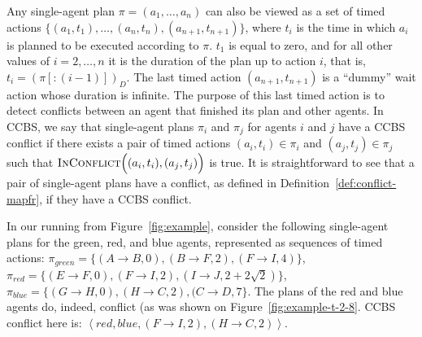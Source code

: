 \documentclass[review]{elsarticle}
\newtheorem{lemma}{Lemma}
\newcommand{\tuple}[1]{\ensuremath{\left \langle #1 \right \rangle }}
\newcommand\roni[1]{\nb{\textbf{Roni:}}{green}{#1}}
\newcommand{\ccbs}{\ac{CCBS}\xspace}
\newcommand{\inconflict}{\textsc{InConflict}\xspace}
\begin{document}
Any single-agent plan $\pi = (a_1,\ldots, a_n)$ can also be viewed as a set of timed actions $\big\{ (a_1,t_1),\ldots,(a_n,t_n) ,(a_{n+1},t_{n+1}) \big\}$, where $t_i$ is the time in which $a_i$ is planned to be executed according to $\pi$. 
$t_1$ is equal to zero, and for all other values of $i=2,\ldots, n$ it is the duration of the plan up to action $i$, that is, $t_i=(\pi[:(i-1)])_D$. 
The last timed action $(a_{n+1}, t_{n+1})$ is a ``dummy'' wait action whose duration is infinite. The purpose of this last timed action is to detect conflicts between an agent that finished its plan and other agents. 
In \ccbs, we say that single-agent plans $\pi_i$ and $\pi_j$ for agents $i$ and $j$ have a \ccbs  conflict if there exists a pair of timed actions $(a_i,t_i)\in \pi_i$ and $(a_j,t_j)\in \pi_j$ such that $\inconflict \Big((a_i,t_i), (a_j,t_j)\Big)$ is true. 
It is straightforward to see that a pair of single-agent plans 
have a conflict, as defined in Definition~\ref{def:conflict-mapfr},
if they have a \ccbs conflict.


In our running from Figure~\ref{fig:example}, consider the following single-agent plans for the green, red, and blue agents, represented as sequences of timed actions:  $\pi_{green}=\{(A \rightarrow B, 0), (B \rightarrow F, 2), (F \rightarrow I, 4)\}$, $\pi_{red}=\{(E \rightarrow F, 0), (F \rightarrow I, 2), (I \rightarrow J, 2+2\sqrt{2})\}$, $\pi_{blue}=\{(G \rightarrow H, 0), (H \rightarrow C, 2), (C \rightarrow D, 7\}$. The plans of the red and blue agents do, indeed, conflict (as was shown on Figure~\ref{fig:example-t-2-8}. \ccbs conflict here is: $\tuple{red, blue, (F \rightarrow I, 2), (H \rightarrow C, 2)}$.  


\end{document}

